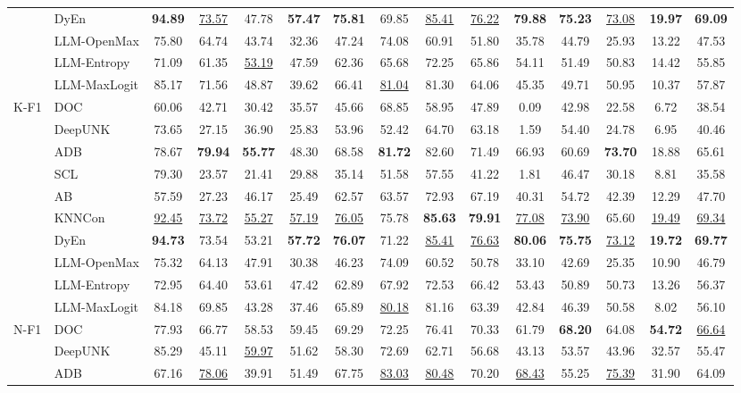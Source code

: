 \begin{tabular}{llccccccccccccc}
&DyEn&\textbf{94.89}&\underline{73.57}&47.78&\textbf{57.47}&\textbf{75.81}&69.85&\underline{85.41}&\underline{76.22}&\textbf{79.88}&\textbf{75.23}&\underline{73.08}&\textbf{19.97}&\textbf{69.09}\\
&LLM-OpenMax&75.80&64.74&43.74&32.36&47.24&74.08&60.91&51.80&35.78&44.79&25.93&13.22&47.53\\
&LLM-Entropy&71.09&61.35&\underline{53.19}&47.59&62.36&65.68&72.25&65.86&54.11&51.49&50.83&14.42&55.85\\
&LLM-MaxLogit&85.17&71.56&48.87&39.62&66.41&\underline{81.04}&81.30&64.06&45.35&49.71&50.95&10.37&57.87\\
\cline{1-15}
\multirow[t]{10}{*}{K-F1}&DOC&60.06&42.71&30.42&35.57&45.66&68.85&58.95&47.89&0.09&42.98&22.58&6.72&38.54\\
&DeepUNK&73.65&27.15&36.90&25.83&53.96&52.42&64.70&63.18&1.59&54.40&24.78&6.95&40.46\\
&ADB&78.67&\textbf{79.94}&\textbf{55.77}&48.30&68.58&\textbf{81.72}&82.60&71.49&66.93&60.69&\textbf{73.70}&18.88&65.61\\
&SCL&79.30&23.57&21.41&29.88&35.14&51.58&57.55&41.22&1.81&46.47&30.18&8.81&35.58\\
&AB&57.59&27.23&46.17&25.49&62.57&63.57&72.93&67.19&40.31&54.72&42.39&12.29&47.70\\
&KNNCon&\underline{92.45}&\underline{73.72}&\underline{55.27}&\underline{57.19}&\underline{76.05}&75.78&\textbf{85.63}&\textbf{79.91}&\underline{77.08}&\underline{73.90}&65.60&\underline{19.49}&\underline{69.34}\\
&DyEn&\textbf{94.73}&73.54&53.21&\textbf{57.72}&\textbf{76.07}&71.22&\underline{85.41}&\underline{76.63}&\textbf{80.06}&\textbf{75.75}&\underline{73.12}&\textbf{19.72}&\textbf{69.77}\\
&LLM-OpenMax&75.32&64.13&47.91&30.38&46.23&74.09&60.52&50.78&33.10&42.69&25.35&10.90&46.79\\
&LLM-Entropy&72.95&64.40&53.61&47.42&62.89&67.92&72.53&66.42&53.43&50.89&50.73&13.26&56.37\\
&LLM-MaxLogit&84.18&69.85&43.28&37.46&65.89&\underline{80.18}&81.16&63.39&42.84&46.39&50.58&8.02&56.10\\
\cline{1-15}
\multirow[t]{10}{*}{N-F1}&DOC&77.93&66.77&58.53&59.45&69.29&72.25&76.41&70.33&61.79&\textbf{68.20}&64.08&\textbf{54.72}&\underline{66.64}\\
&DeepUNK&85.29&45.11&\underline{59.97}&51.62&58.30&72.69&62.71&56.68&43.13&53.57&43.96&32.57&55.47\\
&ADB&67.16&\underline{78.06}&39.91&51.49&67.75&\underline{83.03}&\underline{80.48}&70.20&\underline{68.43}&55.25&\underline{75.39}&31.90&64.09\\

\end{tabular}
